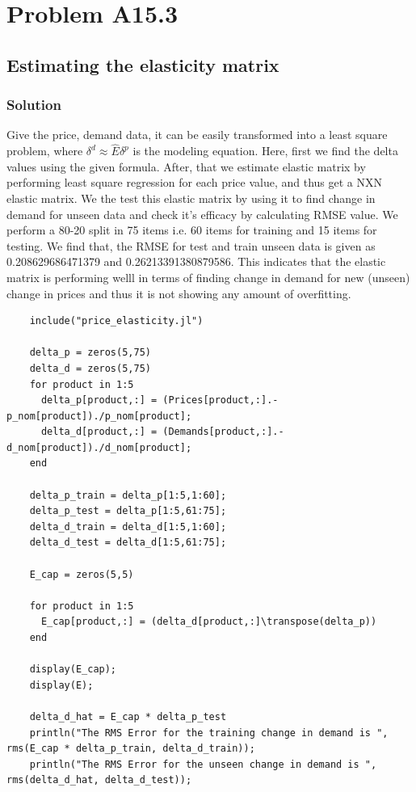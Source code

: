 \documentclass{article}
\begin{document}
\section*{Problem A15.3}
\subsection*{Estimating the elasticity matrix}
\subsubsection*{Solution}
Give the price, demand data, it can be easily transformed into a least square problem, where $\delta^d \approx \hat{E}\delta^p$ is the modeling equation. Here, first we find the delta values using the given formula. After, that we estimate elastic matrix by performing least square regression for each price value, and thus get a NXN elastic matrix. We the test this elastic matrix by using it to find change in demand for unseen data and check it's efficacy by calculating RMSE value. We perform a 80-20 split in 75 items i.e. 60 items for training and 15 items for testing. We find that, the RMSE for test and train unseen data is given as 0.208629686471379 and 0.26213391380879586. This indicates that the elastic matrix is performing welll in terms of finding change in demand for new (unseen) change in prices and thus it is not showing any amount of overfitting.
\begin{verbatim}
    include("price_elasticity.jl")
    
    delta_p = zeros(5,75)
    delta_d = zeros(5,75)
    for product in 1:5
      delta_p[product,:] = (Prices[product,:].- p_nom[product])./p_nom[product];
      delta_d[product,:] = (Demands[product,:].- d_nom[product])./d_nom[product]; 
    end
    
    delta_p_train = delta_p[1:5,1:60];
    delta_p_test = delta_p[1:5,61:75];
    delta_d_train = delta_d[1:5,1:60];
    delta_d_test = delta_d[1:5,61:75];
    
    E_cap = zeros(5,5)
    
    for product in 1:5
      E_cap[product,:] = (delta_d[product,:]\transpose(delta_p))
    end
    
    display(E_cap);
    display(E);
    
    delta_d_hat = E_cap * delta_p_test
    println("The RMS Error for the training change in demand is ", rms(E_cap * delta_p_train, delta_d_train));
    println("The RMS Error for the unseen change in demand is ", rms(delta_d_hat, delta_d_test));
\end{verbatim}
\end{document}
